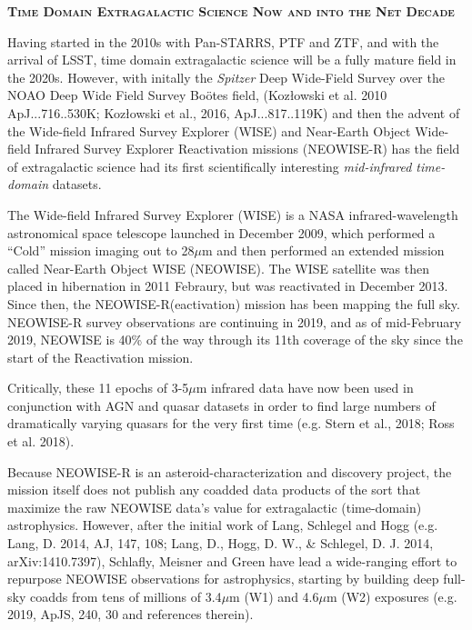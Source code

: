 \documentclass[12pt]{article}
\begin{document}
\pagebreak

\smallskip
\smallskip
\noindent
{\bfseries \textsc{\textcolor{Cerulean}{Time Domain Extragalactic Science Now and into the Net Decade}}}

\smallskip
\noindent
Having started in the 2010s with Pan-STARRS, PTF and ZTF, and with the
arrival of LSST, time domain extragalactic science will be a fully
mature field in the 2020s. However, with initally the {\it Spitzer}
Deep Wide-Field Survey over the NOAO Deep Wide Field Survey Bo\"{o}tes
field, (Koz{\l}owski et al. 2010 ApJ...716..530K; Koz{\l}owski et al.,
2016, ApJ...817..119K) and then the advent of the Wide-field Infrared
Survey Explorer (WISE) and Near-Earth Object Wide-field Infrared
Survey Explorer Reactivation missions (NEOWISE-R) has the field of
extragalactic science had its first scientifically interesting {\it
mid-infrared time-domain} datasets.

\smallskip
\noindent
The Wide-field Infrared Survey Explorer (WISE) is a NASA
infrared-wavelength astronomical space telescope launched in December
2009, which performed a ``Cold'' mission imaging out to 28$\mu$m and
then performed an extended mission called Near-Earth Object WISE
(NEOWISE). The WISE satellite was then placed in hibernation in 2011
Febraury, but was reactivated in December 2013.  Since then, the
NEOWISE-R(eactivation) mission has been mapping the full sky.
NEOWISE-R survey observations are continuing in 2019, and as of
mid-February 2019, NEOWISE is 40\% of the way through its 11th
coverage of the sky since the start of the Reactivation mission.

\smallskip
\noindent
Critically, these 11 epochs of 3-5$\mu$m infrared data have now been
used in conjunction with AGN and quasar datasets in order to find
large numbers of dramatically varying quasars for the very first time
(e.g. Stern et al., 2018; Ross et al. 2018).

\smallskip
\noindent
Because NEOWISE-R is an asteroid-characterization and discovery project, the mission itself does not publish any coadded data products of the sort that maximize the raw NEOWISE data’s value for extragalactic (time-domain) astrophysics. However, after the initial work of Lang, Schlegel and Hogg (e.g. Lang, D. 2014, AJ, 147, 108; Lang, D., Hogg, D. W., \& Schlegel, D. J. 2014, arXiv:1410.7397), Schlafly, Meisner and Green have lead a wide-ranging effort to repurpose NEOWISE observations for astrophysics, starting by building deep full-sky coadds from tens of millions of 3.4$\mu$m (W1) and 4.6$\mu$m (W2) exposures (e.g. 2019, ApJS, 240, 30 and references therein). 
\end{document}
